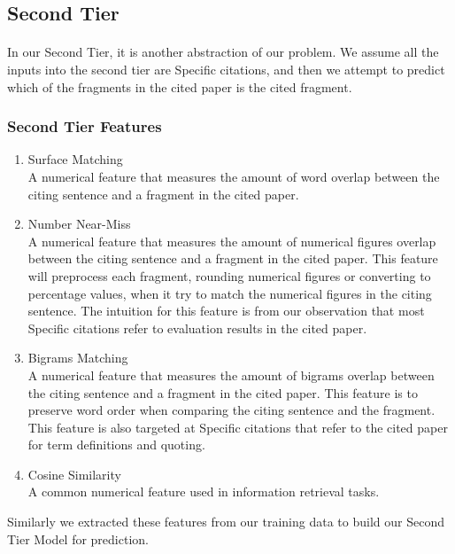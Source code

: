 \subsection{Second Tier}
\paragraph{}
In our Second Tier, it is another abstraction of our problem. We assume all the inputs into the second tier are Specific citations, and then we attempt to predict which of the fragments in the cited paper is the cited fragment.

\subsubsection{Second Tier Features}
\begin{enumerate}
\item Surface Matching \\
A numerical feature that measures the amount of word overlap between the citing sentence and a fragment in the cited paper.

\item Number Near-Miss \\
A numerical feature that measures the amount of numerical figures overlap between the citing sentence and a fragment in the cited paper. This feature will preprocess each fragment, rounding numerical figures or converting to percentage values, when it try to match the numerical figures in the citing sentence. The intuition for this feature is from our observation that most Specific citations refer to evaluation results in the cited paper.

\item Bigrams Matching \\
A numerical feature that measures the amount of bigrams overlap between the citing sentence and a fragment in the cited paper. This feature is to preserve word order when comparing the citing sentence and the fragment. This feature is also targeted at Specific citations that refer to the cited paper for term definitions and quoting.

\item Cosine Similarity \\
A common numerical feature used in information retrieval tasks.
\end{enumerate}
Similarly we extracted these features from our training data to build our Second Tier Model for prediction.